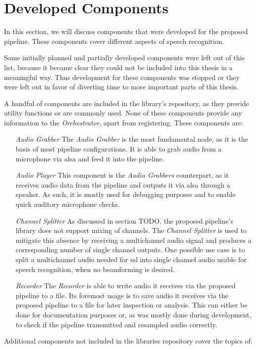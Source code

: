 
\section{Developed Components}
\label{main:components:start}
In this section, we will discuss components that were developed for the proposed pipeline.
These components cover different aspects of speech recognition.

Some initially planned and partially developed components were left out of this list, because it became clear they could not be included into this thesis in a meaningful way.
Thus development for these components was stopped or they were left out in favor of diverting time to more important parts of this thesis.


A handful of components are included in the library's repository, as they provide utility functions or are commonly used.
None of these components provide any information to the \textit{Orchestrator}, apart from registering.
These components are:
\begin{itemize}[leftmargin=1in]
	\item[\textit{Audio Grabber}] The \textit{Audio Grabber} is the most fundamental node, as it is the basis of most pipeline configurations.
	It is able to grab audio from a microphone via \gls{alsa} and feed it into the pipeline.

	\item[\textit{Audio Player}] This component is the \textit{Audio Grabbers} counterpart, as it receives audio data from the pipeline and outputs it via \gls{alsa} through a speaker.
	As such, it is mostly used for debugging purposes and to enable quick auditory microphone checks.

	\item[\textit{Channel Splitter}] As discussed in section TODO, the proposed pipeline's library does not support mixing of channels.
	The \textit{Channel Splitter} is used to mitigate this absence by receiving a multichannel audio signal and produces a corresponding number of single channel outputs.
	One possible use case is to split a multichannel audio needed for \gls{ssl} into single channel audio usable for speech recognition, when no beamforming is desired.

	\item[\textit{Recorder}] The \textit{Recorder} is able to write audio it receives via the proposed pipeline to a file.
	Its foremost usage is to save audio it receives via the proposed pipeline to a file for later inspection or analysis.
	This can either be done for documentation purposes or, as was mostly done during development, to check if the pipeline transmitted and resampled audio correctly.
\end{itemize}
Additional components not included in the libraries repository cover the topics of:

